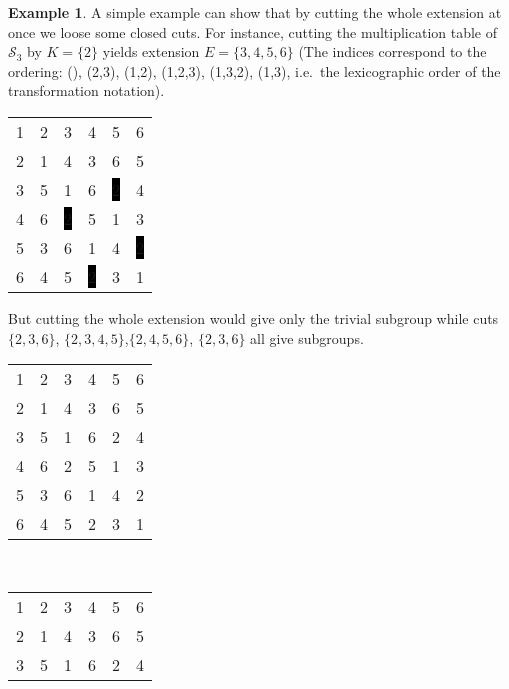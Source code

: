 \documentclass{amsart}
\newcommand{\cS}{{\mathcal S}}
\theoremstyle{plain}
\theoremstyle{definition}
\newtheorem{example}[theorem]{Example}
\begin{document}
\begin{example}
\label{ex:S4cutting2}
A simple example can show that by cutting the whole extension at once we loose some closed cuts. For instance, cutting the multiplication table of $\cS_3$ by $K=\{2\}$ yields extension $E=\{3,4,5,6\}$ (The indices correspond to the ordering:  (), (2,3), (1,2), (1,2,3), (1,3,2), (1,3), i.e.\ the lexicographic order of the transformation notation).
\begin{center}
\setlength{\fboxsep}{1pt}
\begin{tabular}{cccccc}
1&\color{lgr}2&3&4&5&6\\
\color{lgr}2&\color{lgr}1&\color{lgr}4&\color{lgr}3&\color{lgr}6&\color{lgr}5\\
3&\color{lgr}5&1&6&\color{white}\colorbox{black}{2}&4\\
4&\color{lgr}6&\color{white}\colorbox{black}{2}&5&1&3\\
5&\color{lgr}3&6&1&4&\color{white}\colorbox{black}{2}\\
6&\color{lgr}4&5&\color{white}\colorbox{black}{2}&3&1\\
\end{tabular}
\end{center}
But cutting the whole extension would give only the trivial subgroup while cuts $\{2,3,6\}$, $\{2,3,4,5\}$,$\{2,4,5,6\}$, $\{2,3,6\}$ all give subgroups.
\begin{center}
\begin{tabular}{@{}c@{}c@{}c@{}c@{}c@{}c@{}}
1&\color{lgr}2&\color{lgr}3&4&5&\color{lgr}6\\
\color{lgr}2&\color{lgr}1&\color{lgr}4&\color{lgr}3&\color{lgr}6&\color{lgr}5\\
\color{lgr}3&\color{lgr}5&\color{lgr}1&\color{lgr}6&\color{lgr}2&\color{lgr}4\\
4&\color{lgr}6&\color{lgr}2&5&1&\color{lgr}3\\
5&\color{lgr}3&\color{lgr}6&1&4&\color{lgr}2\\
\color{lgr}6&\color{lgr}4&\color{lgr}5&\color{lgr}2&\color{lgr}3&\color{lgr}1\\
\end{tabular}\ \ \ \ 
\begin{tabular}{@{}c@{}c@{}c@{}c@{}c@{}c@{}}
1&\color{lgr}2&\color{lgr}3&\color{lgr}4&\color{lgr}5&6\\
\color{lgr}2&\color{lgr}1&\color{lgr}4&\color{lgr}3&\color{lgr}6&\color{lgr}5\\
\color{lgr}3&\color{lgr}5&\color{lgr}1&\color{lgr}6&\color{lgr}2&\color{lgr}4\\

\end{tabular}
\end{center}
\end{example}
\end{document}
